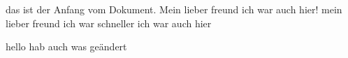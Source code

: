 das ist der Anfang vom Dokument.
Mein lieber freund ich war auch hier!
mein lieber freund ich war schneller ich war auch hier





hello hab auch was geändert
